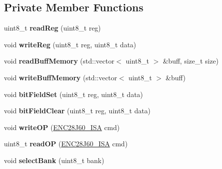 \subsection*{Private Member Functions}
\begin{DoxyCompactItemize}
\item 
\mbox{\label{classEnc28j60_a8aa52f4f9150cfd8975c01c388952be3}} 
uint8\+\_\+t {\bfseries read\+Reg} (uint8\+\_\+t reg)
\item 
\mbox{\label{classEnc28j60_a44f843303ed9e671e867910c337d4421}} 
void {\bfseries write\+Reg} (uint8\+\_\+t reg, uint8\+\_\+t data)
\item 
\mbox{\label{classEnc28j60_a52901d3be0ae0b8ad202927a2e7e3d0f}} 
void {\bfseries read\+Buff\+Memory} (std\+::vector$<$ uint8\+\_\+t $>$ \&buff, size\+\_\+t size)
\item 
\mbox{\label{classEnc28j60_ac242c72302b61d6d4b81508935665c8c}} 
void {\bfseries write\+Buff\+Memory} (std\+::vector$<$ uint8\+\_\+t $>$ \&buff)
\item 
\mbox{\label{classEnc28j60_ac5853b6da39441aa8370bd3e809a3fd8}} 
void {\bfseries bit\+Field\+Set} (uint8\+\_\+t reg, uint8\+\_\+t data)
\item 
\mbox{\label{classEnc28j60_a60cd171ca97f496cbf51350c743e8247}} 
void {\bfseries bit\+Field\+Clear} (uint8\+\_\+t reg, uint8\+\_\+t data)
\item 
\mbox{\label{classEnc28j60_a823d4bd466e9fd160c8730141c8e2e83}} 
void {\bfseries write\+OP} (\mbox{\hyperlink{structENC28J60__ISA}{E\+N\+C28\+J60\+\_\+\+I\+SA}} cmd)
\item 
\mbox{\label{classEnc28j60_a7be0cb9c172c45453783009636548d09}} 
uint8\+\_\+t {\bfseries read\+OP} (\mbox{\hyperlink{structENC28J60__ISA}{E\+N\+C28\+J60\+\_\+\+I\+SA}} cmd)
\item 
\mbox{\label{classEnc28j60_a3d0223a215213be14cccf8a6eb4c65e6}} 
void {\bfseries select\+Bank} (uint8\+\_\+t bank)
\item 
\mbox{\label{classEnc28j60_a1293d524f38225318c67bec2856c2cf3}} 

\end{DoxyCompactItemize}

